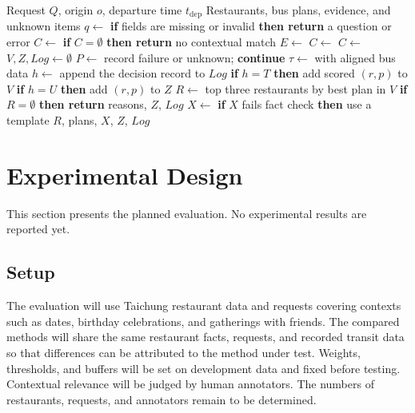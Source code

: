 \documentclass[conference]{IEEEtran}
\begin{document}
\begin{algorithm}[t]
\caption{Context-First Recommendation with Bus Analysis}
\label{alg:main}
\footnotesize
\begin{algorithmic}[1]
\Require Request $Q$, origin $o$, departure time $t_{\mathrm{dep}}$
\Ensure Restaurants, bus plans, evidence, and unknown items
\State $q \gets$ 
\State \textbf{if} fields are missing or invalid \textbf{then return} a question or error
\State $C \gets$ 
\State \textbf{if} $C=\emptyset$ \textbf{then return} no contextual match
\State $E \gets$ 
\State $C \gets$ 
\State $C \gets$ 
\State $V, Z, Log \gets \emptyset$
  \State $P \gets$ 
    \State record failure or unknown; \textbf{continue}
  \EndIf
    \State $\tau \gets$  with aligned bus data
    \State $h \gets$ 
    \State append the decision record to $Log$
    \State \textbf{if} $h=T$ \textbf{then} add scored $(r,p)$ to $V$
    \State \textbf{if} $h=U$ \textbf{then} add $(r,p)$ to $Z$
  \EndFor
\EndFor
\State $R \gets$ top three restaurants by best plan in $V$
\State \textbf{if} $R=\emptyset$ \textbf{then return} reasons, $Z$, $Log$
\State $X \gets$ 
\State \textbf{if} $X$ fails fact check \textbf{then} use a template
\State \Return $R$, plans, $X$, $Z$, $Log$
\end{algorithmic}
\end{algorithm}

\section{Experimental Design}\label{sec:experiments}
This section presents the planned evaluation. No experimental results are reported yet.
\subsection{Setup}
The evaluation will use Taichung restaurant data and requests covering contexts such as dates, birthday celebrations, and gatherings with friends. The compared methods will share the same restaurant facts, requests, and recorded transit data so that differences can be attributed to the method under test. Weights, thresholds, and buffers will be set on development data and fixed before testing. Contextual relevance will be judged by human annotators. The numbers of restaurants, requests, and annotators remain to be determined.
\end{document}

